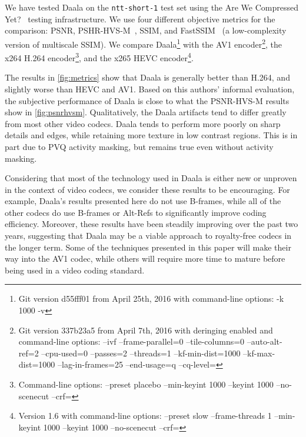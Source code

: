 \documentclass[english,conference,10pt]{IEEEtran}
\begin{document}
We have tested Daala on the \texttt{ntt-short-1} test set
using the Are We Compressed Yet?~\cite{AWCY} testing infrastructure.
We use four different objective metrics for the comparison: PSNR,
PSHR-HVS-M~\cite{PSHRHVSM}, SSIM, and FastSSIM~\cite{FastSSIM} (a low-complexity
version of multiscale SSIM). We compare
Daala\footnote{Git version d55fff01 from April 25th, 2016 with command-line options: -k 1000 -v}
with the AV1 encoder\footnote{Git version 337b23a5 from April 7th, 2016 with deringing enabled and command-line options: --ivf --frame-parallel=0 --tile-columns=0 --auto-alt-ref=2 --cpu-used=0 --passes=2 --threads=1 --kf-min-dist=1000 --kf-max-dist=1000 --lag-in-frames=25 --end-usage=q --cq-level=}, the x264 H.264
encoder\footnote{Command-line options: --preset placebo --min-keyint 1000 --keyint 1000 --no-scenecut --crf=},
and the x265 HEVC encoder\footnote{Version 1.6 with command-line options: --preset slow --frame-threads 1 --min-keyint 1000 --keyint 1000 --no-scenecut --crf=}.

The results in \cref{fig:metrics} show that Daala is generally better than
H.264, and slightly worse than HEVC and AV1. Based on this authors' informal
evaluation, the subjective performance of Daala is close to what the PSNR-HVS-M
results show in \cref{fig:psnrhvsm}. Qualitatively, the Daala artifacts tend to differ
greatly from most other video codecs. Daala tends to perform more poorly on sharp
details and edges, while retaining more texture in low contrast regions. This is in part due
to PVQ activity masking, but remains true even without activity masking.

Considering that most of the technology used in Daala is either new or unproven
in the context of video codecs, we consider these results to be
encouraging. For example, Daala's results presented here do not use B-frames,
while all of the other codecs do use B-frames or Alt-Refs to significantly
improve coding efficiency.
Moreover, these results have been steadily improving over the past
two years, suggesting that Daala may be a viable approach to royalty-free codecs
in the longer term. Some of the techniques presented in this paper will make their
way into the AV1 codec, while others will require more time to mature before
being used in a video coding standard.



\end{document}
